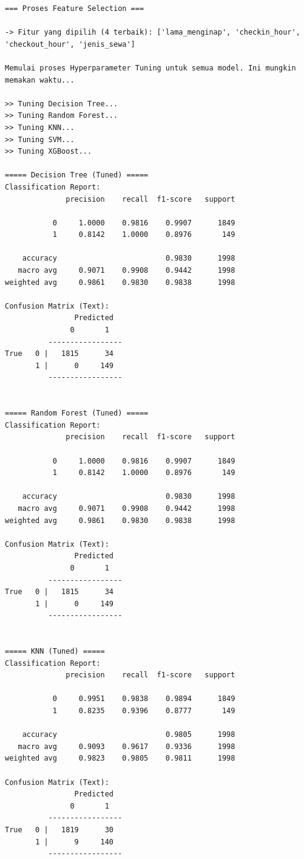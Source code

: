 \begin{lstlisting}[caption={Output 12}]
=== Proses Feature Selection ===

-> Fitur yang dipilih (4 terbaik): ['lama_menginap', 'checkin_hour', 'checkout_hour', 'jenis_sewa']

Memulai proses Hyperparameter Tuning untuk semua model. Ini mungkin memakan waktu...

>> Tuning Decision Tree...
>> Tuning Random Forest...
>> Tuning KNN...
>> Tuning SVM...
>> Tuning XGBoost...

===== Decision Tree (Tuned) =====
Classification Report:
              precision    recall  f1-score   support

           0     1.0000    0.9816    0.9907      1849
           1     0.8142    1.0000    0.8976       149

    accuracy                         0.9830      1998
   macro avg     0.9071    0.9908    0.9442      1998
weighted avg     0.9861    0.9830    0.9838      1998

Confusion Matrix (Text):
                Predicted
               0       1
          -----------------
True   0 |   1815      34
       1 |      0     149
          -----------------


===== Random Forest (Tuned) =====
Classification Report:
              precision    recall  f1-score   support

           0     1.0000    0.9816    0.9907      1849
           1     0.8142    1.0000    0.8976       149

    accuracy                         0.9830      1998
   macro avg     0.9071    0.9908    0.9442      1998
weighted avg     0.9861    0.9830    0.9838      1998

Confusion Matrix (Text):
                Predicted
               0       1
          -----------------
True   0 |   1815      34
       1 |      0     149
          -----------------


===== KNN (Tuned) =====
Classification Report:
              precision    recall  f1-score   support

           0     0.9951    0.9838    0.9894      1849
           1     0.8235    0.9396    0.8777       149

    accuracy                         0.9805      1998
   macro avg     0.9093    0.9617    0.9336      1998
weighted avg     0.9823    0.9805    0.9811      1998

Confusion Matrix (Text):
                Predicted
               0       1
          -----------------
True   0 |   1819      30
       1 |      9     140
          -----------------



\end{lstlisting}
